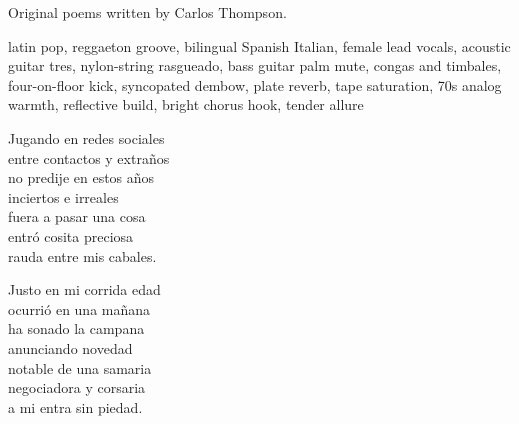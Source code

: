 
\begin{notes}
Original poems written by Carlos Thompson.
\end{notes}
\begin{style}
latin pop, reggaeton groove, bilingual Spanish Italian, female lead vocals, acoustic guitar tres, nylon-string rasgueado, bass guitar palm mute, congas and timbales, four-on-floor kick, syncopated dembow, plate reverb, tape saturation, 70s analog warmth, reflective build, bright chorus hook, tender allure
\end{style}
\begin{lyrics}
Jugando en redes sociales\\
entre contactos y extraños\\
no predije en estos años\\
inciertos e irreales\\
fuera a pasar una cosa\\
entró cosita preciosa\\
rauda entre mis cabales.

Justo en mi corrida edad\\
ocurrió en una mañana\\
ha sonado la campana\\
anunciando novedad\\
notable de una samaria\\
negociadora y corsaria\\
a mi entra sin piedad.
\end{lyrics}

